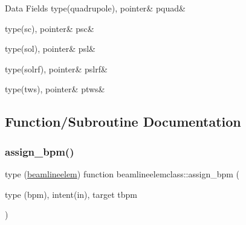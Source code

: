 \begin{DoxyFields}{Data Fields}
\mbox{\label{namespacebeamlineelemclass_a4dc5bf2560031246e9c34bc11576b75c}} 
type(quadrupole), pointer&
pquad&
\\
\hline

\mbox{\label{namespacebeamlineelemclass_ad948a3ca9b39d5bc89fabe69a16b26f2}} 
type(sc), pointer&
psc&
\\
\hline

\mbox{\label{namespacebeamlineelemclass_a227ca9307b3706cafe607d50bc6efaec}} 
type(sol), pointer&
psl&
\\
\hline

\mbox{\label{namespacebeamlineelemclass_ae4662d217dff6d83c07fe77d93525c61}} 
type(solrf), pointer&
pslrf&
\\
\hline

\mbox{\label{namespacebeamlineelemclass_aaf07ee15460778392212e2c7232079a7}} 
type(tws), pointer&
ptws&
\\
\hline

\end{DoxyFields}


\subsection{Function/\+Subroutine Documentation}
\mbox{\label{namespacebeamlineelemclass_a078ba2f100d1ff9fe51c4ff957e30897}} 
\subsubsection{\texorpdfstring{assign\_bpm()}{assign\_bpm()}}
{\footnotesize\ttfamily type (\mbox{\hyperlink{namespacebeamlineelemclass_structbeamlineelemclass_1_1beamlineelem}{beamlineelem}}) function beamlineelemclass\+::assign\+\_\+bpm (\begin{DoxyParamCaption}\item[{type (bpm), intent(in), target}]{tbpm }\end{DoxyParamCaption})}

